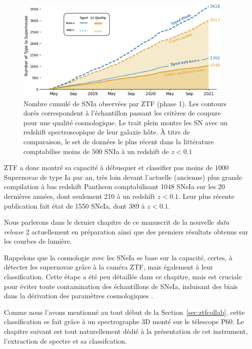 \documentclass[../main/main.tex]{subfiles}
\begin{document}
\begin{figure}[h]
  \centering
  \includegraphics[width=0.95\textwidth]{../figures/02_ztf/cumulsniaztf.png}
  \caption[Nombre cumulé de SNIa observés par ZTF (phase 1)]{Nombre
    cumulé de SNIa observées par ZTF (phase 1). Les contours dorés
    correspondent à l'échantillon passant les critères de coupure pour
    une qualité cosmologique. Le trait plein montre les SN avec un
    redshift spectroscopique de leur galaxie hôte. À titre de
    comparaison, le set de données le plus récent dans la littérature
    comptabilise moins de $500$ SNIa à un redshift de $z<0.1$}
  \label{fig:cumulsniaztf}
\end{figure}

ZTF a donc montré sa capacité à débusquer et classifier pas moins de
$1000$ Supernovae de type Ia par an, très loin devant l'actuelle (ancienne)
plus grande compilation à bas redshift Pantheon \citep{Scolnicpantheon18} comptabilisant 1048 SNeIa
sur les 20 dernières années, dont seulement 210 à un redshift
$z<0.1$. Leur plus récente publication
\citep[Pantheon+,][]{Scolnicpantheon21} fait état de 1550 SNeIa, dont 389 à $z<0.1$.

Nous parlerons dans le dernier chapitre de ce manuscrit de la nouvelle
\textit{data release} 2 actuellement en préparation ainsi que des premiers résultats obtenus sur les courbes de
lumière.

Rappelons que la cosmologie avec les SNeIa se base sur la capacité, certes, à
détecter les supernovae grâce à la caméra ZTF, mais également à leur
classification. Cette étape a été peu détaillée dans ce chapitre, mais
est cruciale pour éviter toute contamination des échantillons de SNeIa,
induisant des biais dans la dérivation des paramètres cosmologiques
\citep{JonesScolnic17SNcontam}.

Comme nous l'avons mentionné au tout
début de la Section~\ref{sec:ztfcollab}, cette classification se fait
grâce à un spectrographe 3D monté sur le télescope P60. Le chapitre
suivant est tout naturellement dédié à la présentation de cet
instrument, l'extraction de spectre et sa classifcation.


%
%
\end{document}
